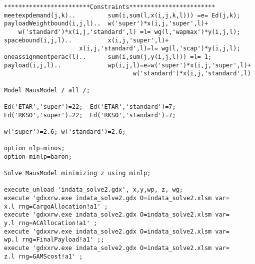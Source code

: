 \begin{lstlisting}
************************Constraints************************
meetexpdemand(j,k)..         sum(i,sum(l,x(i,j,k,l))) =e= Ed(j,k);
payloadWeightbound(i,j,l)..  w('super')*x(i,j,'super',l)+
    w('standard')*x(i,j,'standard',l) =l= wg(l,'wapmax')*y(i,j,l);
spacebound(i,j,l)..          x(i,j,'super',l)+
                     x(i,j,'standard',l)=l= wg(l,'scap')*y(i,j,l);
oneassignmentperac(l)..      sum(i,sum(j,y(i,j,l))) =l= 1;
payload(i,j,l)..             wp(i,j,l)=e=w('super')*x(i,j,'super',l)+
                                    w('standard')*x(i,j,'standard',l)

Model MausModel / all /;

Ed('ETAR','super')=22;  Ed('ETAR','standard')=7;
Ed('RKSO','super')=22;  Ed('RKSO','standard')=7;

w('super')=2.6; w('standard')=2.6;

option nlp=minos;
option minlp=baron;

Solve MausModel minimizing z using minlp;

execute_unload 'indata_solve2.gdx', x,y,wp, z, wg;
execute 'gdxxrw.exe indata_solve2.gdx O=indata_solve2.xlsm var= 
x.l rng=CargoAllocation!a1' ;
execute 'gdxxrw.exe indata_solve2.gdx O=indata_solve2.xlsm var=
y.l rng=ACAllocation!a1' ;
execute 'gdxxrw.exe indata_solve2.gdx O=indata_solve2.xlsm var=
wp.l rng=FinalPayload!a1' ;;
execute 'gdxxrw.exe indata_solve2.gdx O=indata_solve2.xlsm var=
z.l rng=GAMScost!a1' ;
\end{lstlisting}

